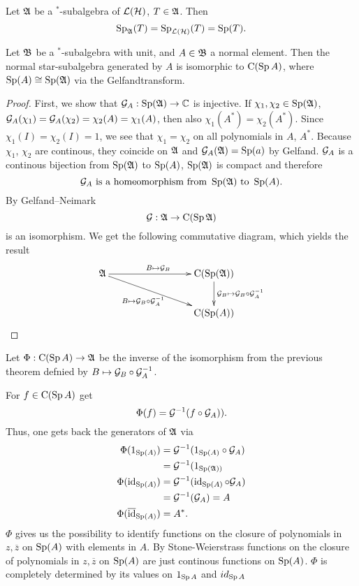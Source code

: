\documentclass[a4paper,10pt]{article}
\begin{document}
\begin{cor}
 Let $\mathfrak{A}$ be a $^*$-subalgebra of $\mathcal{L}(\mathcal{H})$, $T \in \mathfrak{A}$. Then 
\[
 \operatorname{Sp}_{\mathfrak{A}} (T) = \operatorname{Sp}_{\mathcal{L}(\mathcal{H})}(T) = \operatorname{Sp}(T).
\]
\end{cor}

\begin{prop}
 Let $\mathfrak{B}$ be a $^*$-subalgebra with unit, and $A \in \mathfrak{B}$ a normal element. Then the normal star-subalgebra generated by $A$ is isomorphic to $\operatorname{C} (\operatorname{Sp} A)$, where $\operatorname{Sp}(A) \cong \operatorname{Sp}(\mathfrak{A})$ via the Gelfandtransform.
\end{prop}

\begin{proof}
 First, we show that $\mathcal{G}_A : \operatorname{Sp}(\mathfrak{A}) \to \mathbb{C}$ is injective. If $\chi_1 , \chi_2 \in \operatorname{Sp}(\mathfrak{A})$, $\mathcal{G}_A(\chi_1) = \mathcal{G}_A(\chi_2)=\chi_2(A)=\chi_1(A)$, then also $\chi_1(A^*)=\chi_2(A^*)$. Since $\chi_1(I)=\chi_2(I)=1$, we see that $\chi_1 = \chi_2$ on all polynomials in $A$, $A^*$. Because $\chi_1$, $\chi_2$ are continous, they coincide on $\mathfrak{A}$ and $\mathcal{G}_A(\mathfrak{A})=\operatorname{Sp}(a)$ by Gelfand. $\mathcal{G}_A$ is a continous bijection from $\operatorname{Sp}(\mathfrak{A})$ to $\operatorname{Sp}(A)$, $\operatorname{Sp}(\mathfrak{A})$ is compact and therefore
\[
 \mathcal{G}_A \text{ is a homeomorphism from } \operatorname{Sp}(\mathfrak{A}) \text{ to } \operatorname{Sp}(A).
\]
By Gelfand--Neimark 
\[
 \mathcal{G} : \mathfrak{A} \to \operatorname{C}(\operatorname{Sp} \mathfrak{A})
\]
is an isomorphism. We get the following commutative diagram, which yields the result
\[
\xymatrix{
 \A \ar[rrr]^{{B \mapsto \G_B}} \ar[drrr]_{B \mapsto \G_B \circ \G_A \inv~~~} &&& \cf(\spe(\A)) \ar[d]^{\G_B \mapsto \G_B \circ \G_A \inv} \\
   &&&  \cf(\spe(A))}
\]




\end{proof}

\begin{rem}
  Let $\Phi : \operatorname{C} (\operatorname{Sp} A) \to \mathfrak{A}$ be the inverse of the isomorphism from the previous theorem defnied by $B \mapsto \mathcal{G}_B \circ \mathcal{G}_A ^{-1}$.
 
  For $f \in \operatorname{C}(\operatorname{Sp} A)$ get 
  \[
   \Phi (f) = \mathcal{G} ^{-1} (f \circ \mathcal{G}_A)).
  \]
  Thus, one gets back the generators of $\mathfrak{A}$ via
   \begin{align*}
      \Phi (1_{\operatorname{Sp}(A)})   		&= \mathcal{G} ^{-1} (1 _{\operatorname{Sp}(A)} \circ \mathcal{G}_A ) \\
				    &= \mathcal{G} ^{-1} (1_{\operatorname{Sp}(\mathfrak{A}))} \\
      \Phi (\operatorname{id}_{\operatorname{Sp} (A)})		&= \mathcal{G} ^{-1} (\operatorname{id}_{\operatorname{Sp} (A)} \circ \mathcal{G}_A) \\
				    &= \mathcal{G} ^{-1} (\mathcal{G}_A) = A \\
      \Phi (\overline{\operatorname{id}}_{\operatorname{Sp} (A)}) 	&= A^*.
   \end{align*}
  $\Phi$ gives us the possibility to identify functions on the closure of polynomials in $z, \overline{z}$ on $\operatorname{Sp} (A)$ with elements in $A$. By Stone-Weierstrass functions on the closure of polynomials in $z, \overline{z}$ on $\operatorname{Sp} (A)$ are just continous functions on $\operatorname{Sp} (A)$. $\Phi$ is completely determined by its values on $1_{\operatorname{Sp} A}$ and $id_{\operatorname{Sp} A}$
\end{rem}
\end{document}
